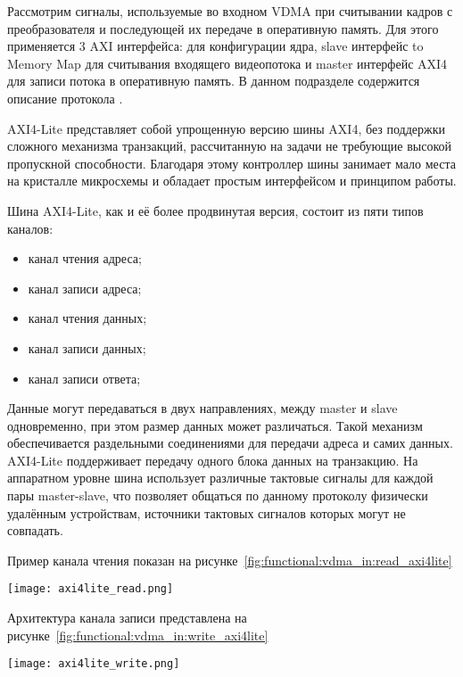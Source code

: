 Рассмотрим сигналы, используемые во входном VDMA при считывании кадров с преобразователя и последующей их передаче
в оперативную память. Для этого применяется 3 AXI интерфейса:  для конфигурации ядра,
slave интерфейс  to Memory Map для считывания входящего видеопотока и master интерфейс AXI4
для записи потока в оперативную память. В данном подразделе содержится описание протокола .


AXI4-Lite представляет собой упрощенную версию шины AXI4, без поддержки сложного механизма транзакций,
рассчитанную на задачи не требующие высокой пропускной способности. Благодаря этому контроллер шины
занимает мало места на кристалле микросхемы и обладает простым интерфейсом и принципом работы.

Шина AXI4-Lite, как и её более продвинутая версия, состоит из пяти типов каналов:

\begin{itemize}
  \item канал чтения адреса;
  \item канал записи адреса;
  \item канал чтения данных;
  \item канал записи данных;
  \item канал записи ответа;
\end{itemize}

Данные могут передаваться в двух направлениях, между master и slave одновременно,
при этом размер данных может различаться. Такой механизм обеспечивается раздельными соединениями
для передачи адреса и самих данных. AXI4-Lite поддерживает передачу одного блока данных на транзакцию.
На аппаратном уровне шина использует различные тактовые сигналы для каждой пары master-slave,
что позволяет общаться по данному протоколу физически удалённым устройствам, источники
тактовых сигналов которых могут не совпадать. %

Пример канала чтения показан на рисунке~\ref{fig:functional:vdma_in:read_axi4lite}

\begin{center}
  \centering
  \texttt{[image: axi4lite\_read.png]}
  \label{fig:functional:vdma_in:read_axi4lite}
\end{center}

Архитектура канала записи представлена на рисунке~\ref{fig:functional:vdma_in:write_axi4lite}

\begin{center}
  \centering
  \texttt{[image: axi4lite\_write.png]}
  \label{fig:functional:vdma_in:write_axi4lite}
\end{center}


